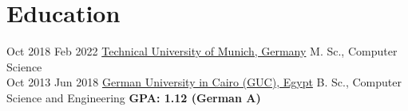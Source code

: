 
\section{Education}
\begin{twenty}
    \twentyitem
        {Oct 2018}
        {Feb 2022}
        {\href{https://www.tum.de/}{Technical University of Munich, Germany}}
        {}
        {M. Sc., Computer Science}
        {\\}
    \twentyitem
        {Oct 2013}
        {Jun 2018}
        {\href{http://www.guc.edu.eg/}{German University in Cairo (GUC), Egypt}}
        {}
        {B. Sc., Computer Science and Engineering \textbf{ GPA: 1.12 (German A)}}
\end{twenty}
